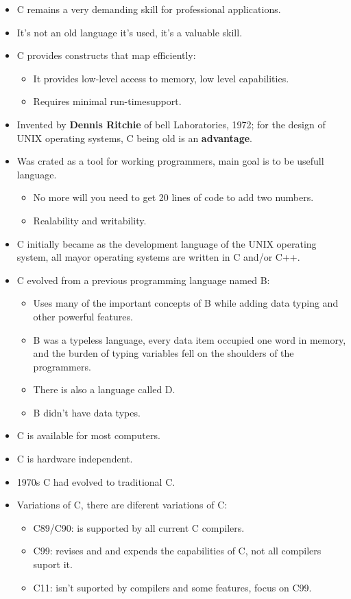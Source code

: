 \begin{itemize}
    \item C remains a very demanding skill for professional applications.
    \item It's not an old language it's used, it's a valuable skill.
    \item C provides constructs that map efficiently:
        \begin{itemize}
            \item It provides low-level access to memory, low level capabilities.
            \item Requires minimal run-timesupport.
        \end{itemize}
    
    \item Invented by \textbf{Dennis Ritchie} of bell Laboratories, 1972; for the design of UNIX operating systems, C being old is an \textbf{advantage}.
    \item Was crated as a tool for working programmers, main goal is to be usefull language.
        \begin{itemize}
            \item No more will you need to get 20 lines of code to add two numbers.
            \item Realability and writability.
        \end{itemize}
    
    \item C initially became as the development language of the UNIX operating system, all mayor operating systems are written in C and/or C++.
    
    \item C evolved from a previous programming language named B:
        \begin{itemize}
            \item Uses many of the important concepts of B while adding data typing and other powerful features.
            \item B was a typeless language, every data item occupied one word in memory, and the burden of typing variables fell on the shoulders of the programmers.
            \item There is also a language called D.
            \item B didn't have data types.
        \end{itemize}
    
    \item C is available for most computers.
    \item C is hardware independent.
    \item 1970s C had evolved to traditional C.
    \item Variations of C, there are diferent variations of C:
        \begin{itemize}
            \item C89/C90: is supported by all current C compilers.
            \item C99: revises and and expends the capabilities of C, not all compilers suport it.
            \item C11: isn't suported by compilers and some features, focus on C99.
        \end{itemize}
    

\end{itemize}
